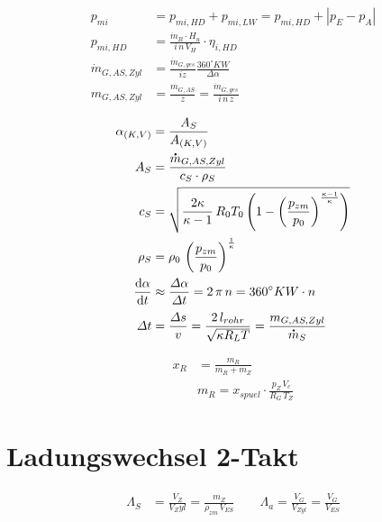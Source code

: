\documentclass[english,threecolumn,color]{latex4ei/latex4ei_sheet}
\begin{document}
\begin{sectionbox}
	\begin{align*}
		p_{mi}&=p_{mi,HD}+p_{mi,LW}=p_{mi,HD}+ |p_E-p_A|\\
		p_{mi,HD}&=\frac{\dot{m}_B \cdot H_u}{i \, n \, V_H}\cdot \eta_{i,HD}\\
	   \dot{m}_{G,AS,Zyl}&=\frac{\dot{m}_{G,ges}}{ i z}\frac{360^\circ KW}{\varDelta \alpha}\\
		m_{G,AS,Zyl}&=\frac{m_{G,AS}}{z}=\frac{\dot{m}_{G,ges}}{i \, n \, z}
	\end{align*}
\end{sectionbox}
\begin{sectionbox}
\begin{align*}
	\alpha_{(K,V)}&=\frac{A_S}{A_{(K,V)}}\\
			   A_S&=\frac{\dot{m}_{G,AS,Zyl}}{c_S \cdot \rho_{S}}\\
				  c_S&=\sqrt{\frac{2 \kappa}{\kappa -1} \, R_0 T_0 \left( 1- \left( \frac{p_{zm}}{p_0} \right)^{\frac{\kappa-1}{\kappa}} \right)}\\
				  \rho_{S}&=\rho_{0} \, \left( \frac{p_{zm}}{p_0} \right)^{\frac{1}{\kappa}}\\
				  \frac{\diff\alpha}{\diff t}&\approx \frac{\varDelta \alpha}{\varDelta t} = 2\,\pi\, n = 360^\circ KW \cdot n \\
				   \varDelta t &= \frac{\varDelta s}{v}=\frac{2 \, l_{rohr}}{\sqrt{\kappa R_L T}}=\frac{m_{G,AS,Zyl}}{\dot{m}_S}
\end{align*}
\end{sectionbox}
\begin{sectionbox}
	\begin{align*}
		x_R&=\frac{m_R}{m_R+m_Z}\\
		& m_R= x_{spuel}\cdot \frac{p_Z \, V_c}{R_G \, T_Z}
	\end{align*}
\end{sectionbox}

\section{Ladungswechsel 2-Takt}

\begin{sectionbox}
	\begin{align*}
		\Lambda_S &=\frac{V_Z}{V_Zyl} = \frac{m_Z}{\rho_{zm}\, V_{ES}} \qquad
		\Lambda_a =\frac{V_G}{V_{Zyl}} = \frac{V_G}{V_{ES}}
	\end{align*}
\end{sectionbox}
\end{document}
